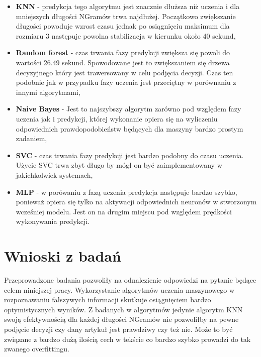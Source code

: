 \begin{itemize}
    \begin{itemize}
        \item \textbf{KNN} -
        predykcja tego algorytmu jest znacznie dłuższa niż uczenia i dla mniejszych długości NGramów trwa
        najdłużej. Początkowo zwiększanie długości powoduje wzrost czasu jednak po osiągnięciu maksimum dla rozmiaru 3
        następuje powolna stabilizacja w kierunku około 40 sekund,
        \item \textbf{Random forest} -
        czas trwania fazy predykcji zwiększa się powoli do wartości 26.49 sekund. Spowodowane jest to zwiększaniem
        się drzewa decyzyjnego który jest trawersowany w celu podjęcia decyzji. Czas ten podobnie jak w przypadku 
        fazy uczenia jest przeciętny w porównaniu z innymi algorytmami,
        \item \textbf{Naive Bayes} -
        Jest to najszybszy algorytm zarówno pod względem fazy uczenia jak i predykcji, której wykonanie 
        opiera się na wyliczeniu odpowiednich prawdopodobieństw będących dla maszyny bardzo prostym zadaniem,
        \item \textbf{SVC} -
        czas trwania fazy predykcji jest bardzo podobny do czasu uczenia. Użycie SVC trwa zbyt długo
        by mógł on być zaimplementowany w jakichkolwiek systemach,
        \item \textbf{MLP} -
        w porówaniu z fazą uczenia predykcja następuje bardzo szybko, ponieważ opiera się tylko
        na aktywacji odpowiednich neuronów w stworzonym wcześniej modelu. Jest on na drugim miejscu
        pod względem prędkości wykonywania predykcji.
    \end{itemize}
\end{itemize}




\section{Wnioski z badań}
Przeprowadzone badania pozwoliły na odnalezienie odpowiedzi na pytanie 
będące celem niniejszej pracy. Wykorzystanie algorytmów uczenia maszynowego 
w rozpoznawaniu fałszywych informacji skutkuje osiągnięciem bardzo optymistycznych wyników.
Z badanych w algorytmów jedynie algorytm KNN swoją efektywnością dla 
każdej długości NGramów nie pozwoliłby na pewne podjęcie decyzji czy dany artykuł jest prawdziwy czy też nie.
Może to być związane z bardzo dużą ilością cech w tekście co bardzo szybko prowadzi do tak zwanego 
overfittingu. 

